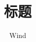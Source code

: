 \documentclass[a4paper, 11pt, titlepage]{article}
\newcommand{\wuhao}{\fontsize{10.5pt}{10.5pt}\selectfont}   %
\renewcommand{\today}{\number\year 年 \number\month 月 \number\day 日}
\begin{document}
\renewcommand{\normalsize}{\wuhao}

\setlength{\parindent}{2em}                    

\title{标题}
\author{Wind}
\maketitle








%
\end{document}
